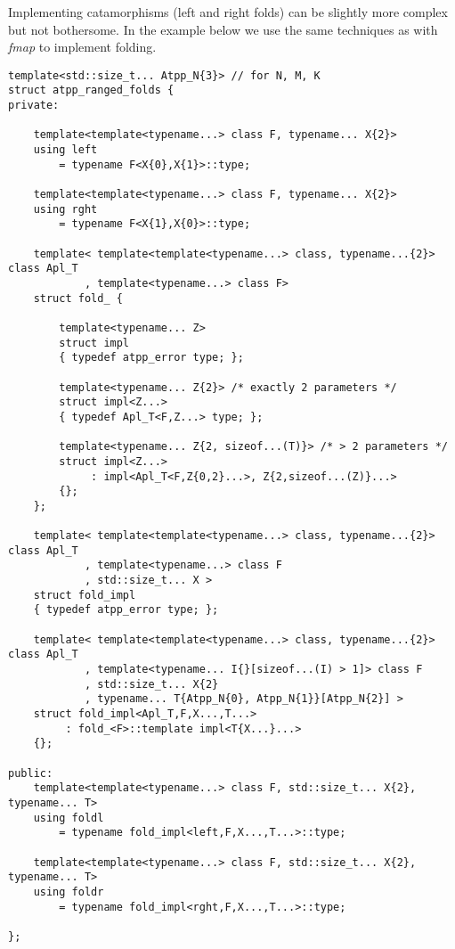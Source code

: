 \newpage

\p Implementing catamorphisms (left and right folds) can be slightly more complex but not bothersome.
In the example below we use the same techniques as with \textit{fmap} to implement folding.

\begin{verbatim}
template<std::size_t... Atpp_N{3}> // for N, M, K
struct atpp_ranged_folds {
private:
    
    template<template<typename...> class F, typename... X{2}>
    using left
        = typename F<X{0},X{1}>::type;
    
    template<template<typename...> class F, typename... X{2}>
    using rght
        = typename F<X{1},X{0}>::type;
    
    template< template<template<typename...> class, typename...{2}> class Apl_T
            , template<typename...> class F>
    struct fold_ {
        
        template<typename... Z>
        struct impl
        { typedef atpp_error type; };
        
        template<typename... Z{2}> /* exactly 2 parameters */
        struct impl<Z...>
        { typedef Apl_T<F,Z...> type; };
        
        template<typename... Z{2, sizeof...(T)}> /* > 2 parameters */
        struct impl<Z...>
             : impl<Apl_T<F,Z{0,2}...>, Z{2,sizeof...(Z)}...>
        {};
    };
    
    template< template<template<typename...> class, typename...{2}> class Apl_T
            , template<typename...> class F
            , std::size_t... X >
    struct fold_impl
    { typedef atpp_error type; };
    
    template< template<template<typename...> class, typename...{2}> class Apl_T
            , template<typename... I{}[sizeof...(I) > 1]> class F
            , std::size_t... X{2}
            , typename... T{Atpp_N{0}, Atpp_N{1}}[Atpp_N{2}] >
    struct fold_impl<Apl_T,F,X...,T...>
         : fold_<F>::template impl<T{X...}...>
    {};
    
public:
    template<template<typename...> class F, std::size_t... X{2}, typename... T>
    using foldl
        = typename fold_impl<left,F,X...,T...>::type;
    
    template<template<typename...> class F, std::size_t... X{2}, typename... T>
    using foldr
        = typename fold_impl<rght,F,X...,T...>::type;
    
};
\end{verbatim}

\newpage
